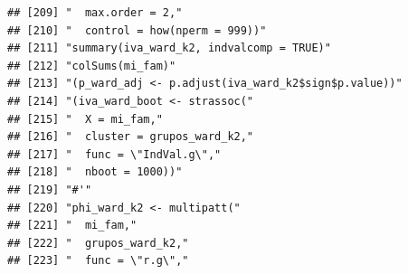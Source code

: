 \documentclass[11pt,]{article}
\begin{document}
\begin{verbatim}
## [209] "  max.order = 2,"                                                                                                                                                      
## [210] "  control = how(nperm = 999))"                                                                                                                                         
## [211] "summary(iva_ward_k2, indvalcomp = TRUE)"                                                                                                                               
## [212] "colSums(mi_fam)"                                                                                                                                                       
## [213] "(p_ward_adj <- p.adjust(iva_ward_k2$sign$p.value))"                                                                                                                    
## [214] "(iva_ward_boot <- strassoc("                                                                                                                                           
## [215] "  X = mi_fam,"                                                                                                                                                         
## [216] "  cluster = grupos_ward_k2,"                                                                                                                                           
## [217] "  func = \"IndVal.g\","                                                                                                                                                
## [218] "  nboot = 1000))"                                                                                                                                                      
## [219] "#'"                                                                                                                                                                    
## [220] "phi_ward_k2 <- multipatt("                                                                                                                                             
## [221] "  mi_fam,"                                                                                                                                                             
## [222] "  grupos_ward_k2,"                                                                                                                                                     
## [223] "  func = \"r.g\","                                                                                                                                                     

\end{verbatim}
\end{document}
